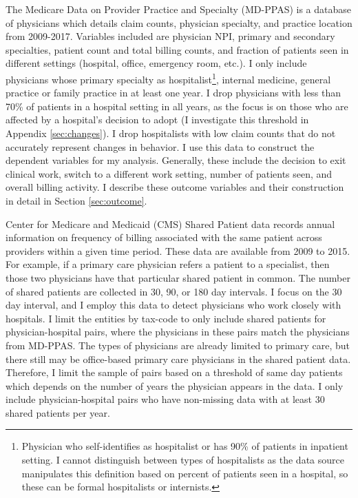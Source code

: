 \documentclass[12pt]{article}
\begin{document}
The Medicare Data on Provider Practice and Specialty (MD-PPAS) is a database of physicians which details claim counts, physician specialty, and practice location from 2009-2017. Variables included are physician NPI, primary and secondary specialties, patient count and total billing counts, and fraction of patients seen in different settings (hospital, office, emergency room, etc.). I only include physicians whose primary specialty as hospitalist\footnote{Physician who self-identifies as hospitalist or has 90\% of patients in inpatient setting. I cannot distinguish between types of hospitalists as the data source manipulates this definition based on percent of patients seen in a hospital, so these can be formal hospitalists or internists.}, internal medicine, general practice or family practice in at least one year. I drop physicians with less than 70\% of patients in a hospital setting in all years, as the focus is on those who are affected by a hospital's decision to adopt (I investigate this threshold in Appendix \ref{sec:changes}). I drop hospitalists with low claim counts that do not accurately represent changes in behavior. I use this data to construct the dependent variables for my analysis. Generally, these include the decision to exit clinical work, switch to a different work setting, number of patients seen, and overall billing activity. I describe these outcome variables and their construction in detail in Section \ref{sec:outcome}.


Center for Medicare and Medicaid (CMS) Shared Patient data records annual information on frequency of billing associated with the same patient across providers within a given time period. These data are available from 2009 to 2015. For example, if a primary care physician refers a patient to a specialist, then those two physicians have that particular shared patient in common. The number of shared patients are collected in 30, 90, or 180 day intervals. I focus on the 30 day interval, and I employ this data to detect physicians who work closely with hospitals. I limit the entities by tax-code to only include shared patients for physician-hospital pairs, where the physicians in these pairs match the physicians from MD-PPAS. The types of physicians are already limited to primary care, but there still may be office-based primary care physicians in the shared patient data. Therefore, I limit the sample of pairs based on a threshold of same day patients which depends on the number of years the physician appears in the data. I only include physician-hospital pairs who have non-missing data with at least 30 shared patients per year.
\end{document}
